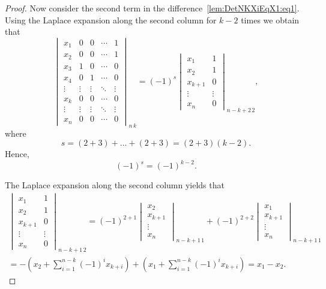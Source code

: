 \documentclass{elsarticle}
\theoremstyle{plain}
\theoremstyle{definition}
\numberwithin{equation}{section}
\begin{document}
\begin{proof}
Now consider the second term in the difference~\eqref{lem:DetNKXiEqX1:eq1}. Using the Laplace expansion along the second column for $k-2$ times we obtain that
\begin{equation}\label{lem:DetNKXiEqX1:eq3}
\begin{vmatrix}
x_1 & 0 & 0 & \cdots & 1\\
x_2 & 0 & 0 & \cdots & 1\\
x_3 & 1 & 0 &\cdots & 0\\
x_4 & 0 & 1 &\cdots & 0\\
\vdots & \vdots & \vdots & \ddots & \vdots\\
x_k & 0 & 0 & \cdots & 0\\
\vdots & \vdots & \vdots & \ddots & \vdots\\
x_{n} & 0 & 0 & \cdots & 0
\end{vmatrix}_{n\,k} = (-1)^{s} \begin{vmatrix}
x_1 & 1\\
x_2 & 1\\
x_{k+1} & 0\\
\vdots & \vdots \\
x_{n} & 0
\end{vmatrix}_{n-k+2\,2},
\end{equation}
where 
\[
s = {(2+3) + \ldots + (2+3)} = (2+3)(k-2).
\]
Hence, \begin{equation}\label{lem:DetNKXiEqX1:eq4}
(-1)^{s} = (-1)^{k-2}.
\end{equation}

The Laplace expansion along the second column yields that
\begin{multline}\label{lem:DetNKXiEqX1:eq2}
\begin{vmatrix}
x_1 & 1\\
x_2 & 1\\
x_{k+1} & 0\\
\vdots & \vdots\\
x_{n} & 0
\end{vmatrix}_{n-k+1\,2} = (-1)^{2 + 1}\begin{vmatrix}
x_2 \\
x_{k+1}\\
\vdots \\
x_{n} 
\end{vmatrix}_{n-k+1\,1}
+ (-1)^{2 + 2}
\begin{vmatrix}
x_1 \\
x_{k+1}\\
\vdots \\
x_{n} 
\end{vmatrix}_{n-k+1\,1}\\ = -\left(x_2 + \sum_{i=1}^{n-k} (-1)^{i} x_{k+i}\right) + \left(x_1 + \sum_{i=1}^{n-k} (-1)^{i} x_{k+i}\right) = x_1 - x_2.
\end{multline}


\end{proof}
\end{document}

